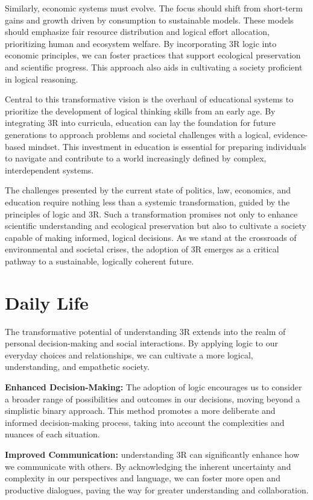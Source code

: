 \documentclass[12pt]{article}
\begin{document}
Similarly, economic systems must evolve. The focus should shift from short-term gains and growth driven by consumption to sustainable models. These models should emphasize fair resource distribution and logical effort allocation, prioritizing human and ecosystem welfare. By incorporating 3R logic into economic principles, we can foster practices that support ecological preservation and scientific progress. This approach also aids in cultivating a society proficient in logical reasoning.


Central to this transformative vision is the overhaul of educational systems to prioritize the development of logical thinking skills from an early age. By integrating 3R into curricula, education can lay the foundation for future generations to approach problems and societal challenges with a logical, evidence-based mindset. This investment in education is essential for preparing individuals to navigate and contribute to a world increasingly defined by complex, interdependent systems.

The challenges presented by the current state of politics, law, economics, and education require nothing less than a systemic transformation, guided by the principles of logic and 3R. Such a transformation promises not only to enhance scientific understanding and ecological preservation but also to cultivate a society capable of making informed, logical decisions. As we stand at the crossroads of environmental and societal crises, the adoption of 3R emerges as a critical pathway to a sustainable, logically coherent future.

\section*{Daily Life}

The transformative potential of understanding 3R extends into the realm of personal decision-making and social interactions. By applying \qbit{} logic to our everyday choices and relationships, we can cultivate a more logical, understanding, and empathetic society.

\textbf{Enhanced Decision-Making:} The adoption of \qbit{} logic encourages us to consider a broader range of possibilities and outcomes in our decisions, moving beyond a simplistic binary approach. This method promotes a more deliberate and informed decision-making process, taking into account the complexities and nuances of each situation.

\textbf{Improved Communication:} understanding 3R can significantly enhance how we communicate with others. By acknowledging the inherent uncertainty and complexity in our perspectives and language, we can foster more open and productive dialogues, paving the way for greater understanding and collaboration.
\end{document}
